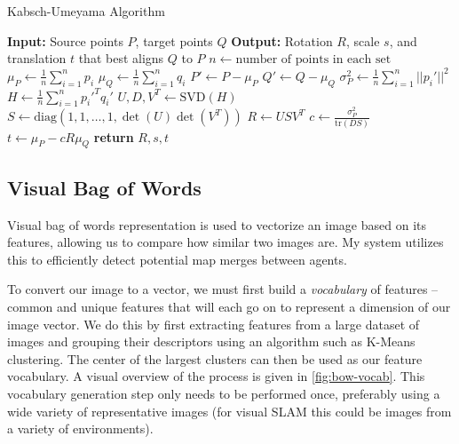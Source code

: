 \begin{algorithm}[H]
    \caption{Kabsch-Umeyama Algorithm}
    \label{alg:kabsch-umeyama}
    \begin{algorithmic}[1]
        \State \textbf{Input:} Source points $P$, target points $Q$
        \State \textbf{Output:} Rotation $R$, scale $s$, and translation $t$ that best aligns $Q$ to $P$
        \State $n \gets \text{number of points in each set}$
        \State $\mu_P \gets \frac{1}{n} \sum_{i=1}^n p_i$
        \State $\mu_Q \gets \frac{1}{n} \sum_{i=1}^n q_i$
        \State $P' \gets P - \mu_P$ 
        \State $Q' \gets Q - \mu_Q$ 
        \State $\sigma^2_P \gets \frac{1}{n} \sum_{i=1}^n ||p_i'||^2$ 
        \State $H \gets \frac{1}{n} \sum_{i=1}^n p_i'^T q_i'$ 
        \State $U, D, V^T \gets \text{SVD}(H)$ 
        \State $S \gets \text{diag}(1, 1, \dots, 1, \det(U)\det(V^T))$
        \State $R \gets USV^T$ 
        \State $c \gets \frac{\sigma^2_P}{\text{tr}(DS)}$ 
        \State $t \gets \mu_P - cR\mu_Q$ 
        \State \textbf{return} $R, s, t$
    \end{algorithmic}
\end{algorithm}

\subsection{Visual Bag of Words}
\label{sec:visual-bag-of-words}
Visual bag of words representation is used to vectorize an image based on its features, allowing us to compare how similar two images are. My system utilizes this to efficiently detect potential map merges between agents.

To convert our image to a vector, we must first build a \textit{vocabulary} of features – common and unique features that will each go on to represent a dimension of our image vector. We do this by first extracting features from a large dataset of images and grouping their descriptors using an algorithm such as K-Means clustering. The center of the largest clusters can then be used as our feature vocabulary. A visual overview of the process is given in \autoref{fig:bow-vocab}. This vocabulary generation step only needs to be performed once, preferably using a wide variety of representative images (for visual SLAM this could be images from a variety of environments).

